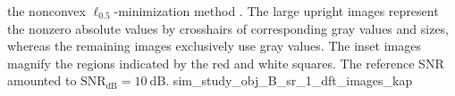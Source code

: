 { the nonconvex $\ell_{0.5}$-minimization method
 .
 The large upright images represent
 the nonzero absolute values by
 crosshairs of
 corresponding gray values and
 sizes, whereas
 the remaining images exclusively use
 gray values.
 The inset images magnify
 the regions indicated by
 the red and white squares.
 The reference \ac{SNR} amounted to
 $\text{SNR}_{\text{dB}} = \SI{10}{\deci\bel}$.
}%
{sim_study_obj_B_sr_1_dft_images_kap}


